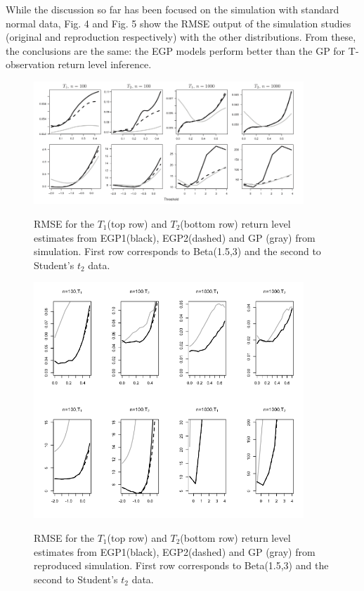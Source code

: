 \documentclass[12pt]{article}
\theoremstyle{definition}
\theoremstyle{definition}
\begin{document}
While the discussion so far has been focused on the simulation with standard normal data, Fig. 4 and Fig. 5 show the RMSE output of the simulation studies (original and reproduction respectively) with the other distributions. From these, the conclusions are the same: the EGP models perform better than the GP for T-observation return level inference.
\begin{figure}[H]
\begin{center}
{\includegraphics[width=4.0in]{project/papafiles/fig4.papa.png}}
\caption{RMSE for the $T_1$(top row) and $T_2$(bottom row) return level estimates from EGP1(black), EGP2(dashed) and GP (gray) from \cite{papatawn} simulation. First row corresponds to Beta(1.5,3) and the second to Student's $t_2$ data.}
{\includegraphics[width=4.0in]{project/papafiles/fig4.me.png}}
\caption{RMSE for the $T_1$(top row) and $T_2$(bottom row) return level estimates from EGP1(black), EGP2(dashed) and GP (gray) from reproduced simulation. First row corresponds to Beta(1.5,3) and the second to Student's $t_2$ data.}
\end{center}
\end{figure}
\end{document}
